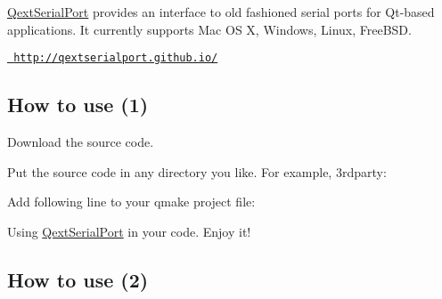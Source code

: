 \mbox{\hyperlink{class_qext_serial_port}{Qext\+Serial\+Port}} provides an interface to old fashioned serial ports for Qt-\/based applications. It currently supports Mac OS X, Windows, Linux, Free\+B\+SD.

\href{http://qextserialport.github.io/}{\texttt{ http\+://qextserialport.\+github.\+io/}}

\subsection*{How to use (1)}


\begin{DoxyItemize}
\item Download the source code.
\item Put the source code in any directory you like. For example, 3rdparty\+:
\end{DoxyItemize}


\begin{DoxyCode}{0}
\DoxyCodeLine{|     |}
\end{DoxyCode}



\begin{DoxyItemize}
\item Add following line to your qmake project file\+:
\end{DoxyItemize}


\begin{DoxyCode}{0}
\end{DoxyCode}



\begin{DoxyItemize}
\item Using \mbox{\hyperlink{class_qext_serial_port}{Qext\+Serial\+Port}} in your code. Enjoy it!
\end{DoxyItemize}


\begin{DoxyCode}{0}
\end{DoxyCode}


\subsection*{How to use (2)}

